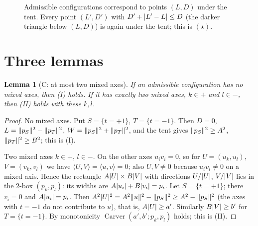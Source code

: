 \documentclass[11pt]{article}
\newtheorem{lemma}[theorem]{Lemma}
\theoremstyle{definition}
\theoremstyle{remark}
\newcommand{\Carver}{\operatorname{Carver}}
\DeclarePairedDelimiter{\abs}{\lvert}{\rvert}
\DeclarePairedDelimiter{\norm}{\lVert}{\rVert}
\begin{document}
\begin{figure}[ht]
\centering
{}
\caption{Admissible configurations correspond to points $(L,D)$ under the tent. Every point
$(L',D')$ with $D'+\abs{L'-L}\le D$ (the darker triangle below $(L,D)$) is again under the tent; this is $(\star)$.}
\label{fig:tent}
\end{figure}

\section{Three lemmas}\label{sec:lemmas}

\begin{lemma}[C: at most two mixed axes]\label{lem:C}
If an admissible configuration has no mixed axes, then (I) holds. If it has exactly two mixed axes,
$k\in+$ and $l\in-$, then (II) holds with these $k,l$.
\end{lemma}
\begin{proof}
No mixed axes. Put $S=\{t=+1\}$, $T=\{t=-1\}$. Then $D=0$, $L=\norm{p_S}^2-\norm{p_T}^2$,
$W=\norm{p_S}^2+\norm{p_T}^2$, and the tent gives $\norm{p_S}^2\ge A^2$, $\norm{p_T}^2\ge B^2$; this is (I).

Two mixed axes $k\in+$, $l\in-$. On the other axes $u_iv_i=0$, so for $U=(u_k,u_l)$, $V=(v_k,v_l)$ we have
$\langle U,V\rangle=\langle u,v\rangle=0$; also $U,V\ne0$ because $u_iv_i\ne0$ on a mixed axis. Hence the
rectangle $A\abs U\times B\abs V$ with directions $U/\abs U$, $V/\abs V$ lies in the $2$-box
$(p_k,p_l)$: its widths are $A\abs{u_i}+B\abs{v_i}=p_i$. Let $S=\{t=+1\}$; there $v_i=0$ and
$A\abs{u_i}=p_i$. Then $A^2\abs U^2=A^2\norm u^2-\norm{p_S}^2\ge A^2-\norm{p_S}^2$ (the axes with
$t=-1$ do not contribute to $u$), that is, $A\abs U\ge a'$. Similarly $B\abs V\ge b'$ for $T=\{t=-1\}$. By
monotonicity $\Carver(a',b';p_k,p_l)$ holds; this is (II).
\end{proof}
\end{document}
